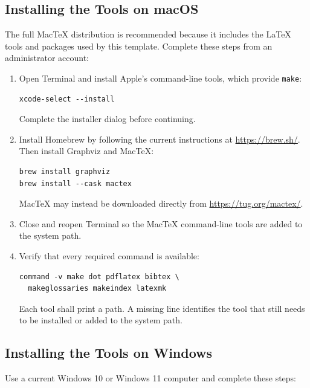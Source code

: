 \subsection{Installing the Tools on macOS}

The full MacTeX distribution is recommended because it includes the LaTeX tools and packages used by this template. Complete these steps from an administrator account:

\begin{enumerate}
  \item Open Terminal and install Apple's command-line tools, which provide \texttt{make}:
\begin{verbatim}
xcode-select --install
\end{verbatim}
  Complete the installer dialog before continuing.

  \item Install Homebrew by following the current instructions at \url{https://brew.sh/}. Then install Graphviz and MacTeX:
\begin{verbatim}
brew install graphviz
brew install --cask mactex
\end{verbatim}
  MacTeX may instead be downloaded directly from \url{https://tug.org/mactex/}.

  \item Close and reopen Terminal so the MacTeX command-line tools are added to the system path.

  \item Verify that every required command is available:
\begin{verbatim}
command -v make dot pdflatex bibtex \
  makeglossaries makeindex latexmk
\end{verbatim}
  Each tool shall print a path. A missing line identifies the tool that still needs to be installed or added to the system path.
\end{enumerate}

\subsection{Installing the Tools on Windows}

Use a current Windows 10 or Windows 11 computer and complete these steps:

